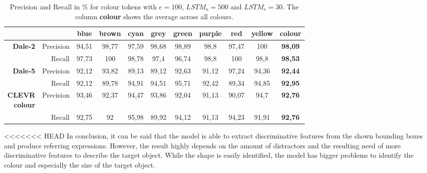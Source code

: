 \documentclass[11pt]{article}
\begin{document}
\begin{table}[ht]
        \centering
        \begin{tabular}{rr|cccccccc|c}
                \toprule
                                                 &             & {blue}  & {brown} & {cyan}  & {grey}  & {green} & {purple} & {red}   & {yellow} & \textbf{colour} \\\midrule
                \multirow{2}{*}{\textbf{Dale-2}} & {Precision} & {94,51} & {98,77} & {97,59} & {98,68} & {98,89} & {98,8}   & {97,47} & {100}    & \textbf{98,09} \\
                                                 & {Recall}    & {97,73} & {100}   & {98,78} & {97,4}  & {96,74} & {98,8}   & {100}   & {98,8}   & \textbf{98,53} \\\midrule
                \multirow{2}{*}{\textbf{Dale-5}} & {Precision} & {92,12} & {93,82} & {89,13} & {89,12} & {92,63} & {91,12}  & {97,24} & {94,36}  & \textbf{92,44} \\
                                                 & {Recall}    & {92,12} & {89,78} & {94,91} & {94,51} & {95,71} & {92,42}  & {89,34} & {94,85}  & \textbf{92,95} \\\midrule
                \multirowcell{2}[0pt][r]{\textbf{CLEVR}                                                                                                           \\\textbf{colour}} & {Precision}           & {93,46} & {92,37} & {94,47} & {93,86} & {92,04} & {91,13}  & {90,07} & {94,7}   & \textbf{92,76} \\
                                                 & {Recall}    & {92,75} & {92}    & {95,98} & {89,92} & {94,12} & {91,13}  & {94,23} & {91,91}  & \textbf{92,76} \\
                \bottomrule
        \end{tabular}
        \caption{Precision and Recall in \% for colour tokens with $e=100$, $LSTM_o=500$ and $LSTM_e=30$. The column \textbf{colour} shows the average across all colours.}
        \label{tab:results:bb-re-generator_color}
\end{table}

<<<<<<< HEAD
In conclusion, it can be said that the model is able to extract discriminative features from the shown bounding boxes and produce referring expressions.
However, the result highly depends on the amount of distractors and the resulting need of more discriminative features to describe the target object.
While the shape is easily identified, the model has bigger problems to identify the colour and especially the size of the target object.
\end{document}
